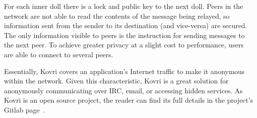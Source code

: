 For each inner doll there is a lock and public key to the next doll. Peers in the network are not able to read the contents of the message being relayed, so information sent from the sender to its destination (and vice-versa) are secured. The only information visible to peers is the instruction for sending messages to the next peer. To achieve greater privacy at a slight cost to performance, users are able to connect to several peers.

Essentially, Kovri covers an application's Internet traffic to make it anonymous within the network. Given this characteristic, Kovri is a great solution for anonymously communicating over IRC, email, or accessing hidden services. As Kovri is an open source project, the reader can find its full details in the project's Gitlab page~\cite{git_kovri}.
